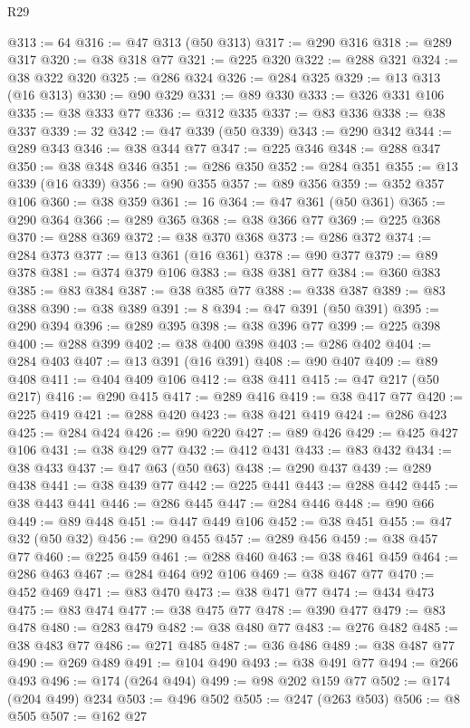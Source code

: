 \begin{lexlean}{R29}
\begin{coremodule}
@313 := 64
@316 := @47 @313 (@50 @313)
@317 := @290 @316
@318 := @289 @317
@320 := @38 @318 @77
@321 := @225 @320
@322 := @288 @321
@324 := @38 @322 @320
@325 := @286 @324
@326 := @284 @325
@329 := @13 @313 (@16 @313)
@330 := @90 @329
@331 := @89 @330
@333 := @326 @331 @106
@335 := @38 @333 @77
@336 := @312 @335
@337 := @83 @336
@338 := @38 @337
@339 := 32
@342 := @47 @339 (@50 @339)
@343 := @290 @342
@344 := @289 @343
@346 := @38 @344 @77
@347 := @225 @346
@348 := @288 @347
@350 := @38 @348 @346
@351 := @286 @350
@352 := @284 @351
@355 := @13 @339 (@16 @339)
@356 := @90 @355
@357 := @89 @356
@359 := @352 @357 @106
@360 := @38 @359
@361 := 16
@364 := @47 @361 (@50 @361)
@365 := @290 @364
@366 := @289 @365
@368 := @38 @366 @77
@369 := @225 @368
@370 := @288 @369
@372 := @38 @370 @368
@373 := @286 @372
@374 := @284 @373
@377 := @13 @361 (@16 @361)
@378 := @90 @377
@379 := @89 @378
@381 := @374 @379 @106
@383 := @38 @381 @77
@384 := @360 @383
@385 := @83 @384
@387 := @38 @385 @77
@388 := @338 @387
@389 := @83 @388
@390 := @38 @389
@391 := 8
@394 := @47 @391 (@50 @391)
@395 := @290 @394
@396 := @289 @395
@398 := @38 @396 @77
@399 := @225 @398
@400 := @288 @399
@402 := @38 @400 @398
@403 := @286 @402
@404 := @284 @403
@407 := @13 @391 (@16 @391)
@408 := @90 @407
@409 := @89 @408
@411 := @404 @409 @106
@412 := @38 @411
@415 := @47 @217 (@50 @217)
@416 := @290 @415
@417 := @289 @416
@419 := @38 @417 @77
@420 := @225 @419
@421 := @288 @420
@423 := @38 @421 @419
@424 := @286 @423
@425 := @284 @424
@426 := @90 @220
@427 := @89 @426
@429 := @425 @427 @106
@431 := @38 @429 @77
@432 := @412 @431
@433 := @83 @432
@434 := @38 @433
@437 := @47 @63 (@50 @63)
@438 := @290 @437
@439 := @289 @438
@441 := @38 @439 @77
@442 := @225 @441
@443 := @288 @442
@445 := @38 @443 @441
@446 := @286 @445
@447 := @284 @446
@448 := @90 @66
@449 := @89 @448
@451 := @447 @449 @106
@452 := @38 @451
@455 := @47 @32 (@50 @32)
@456 := @290 @455
@457 := @289 @456
@459 := @38 @457 @77
@460 := @225 @459
@461 := @288 @460
@463 := @38 @461 @459
@464 := @286 @463
@467 := @284 @464 @92 @106
@469 := @38 @467 @77
@470 := @452 @469
@471 := @83 @470
@473 := @38 @471 @77
@474 := @434 @473
@475 := @83 @474
@477 := @38 @475 @77
@478 := @390 @477
@479 := @83 @478
@480 := @283 @479
@482 := @38 @480 @77
@483 := @276 @482
@485 := @38 @483 @77
@486 := @271 @485
@487 := @36 @486
@489 := @38 @487 @77
@490 := @269 @489
@491 := @104 @490
@493 := @38 @491 @77
@494 := @266 @493
@496 := @174 (@264 @494)
@499 := @98 @202 @159 @77
@502 := @174 (@204 @499) @234
@503 := @496 @502
@505 := @247 (@263 @503)
@506 := @8 @505
@507 := @162 @27

\end{coremodule}
\end{lexlean}

